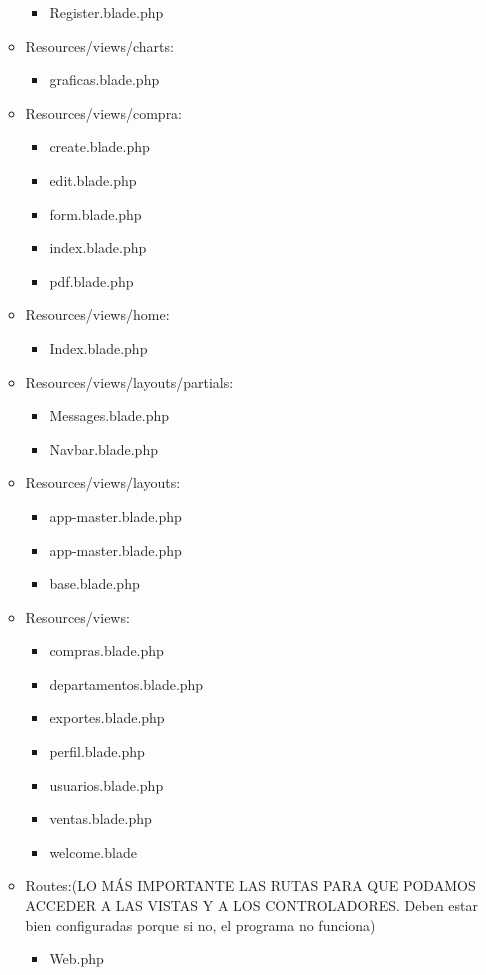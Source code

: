 \documentclass{article}
\begin{document}
\begin{enumerate}
\begin{itemize}
\begin{itemize}
            \item Register.blade.php
        \end{itemize}
    \item Resources/views/charts:
        \begin{itemize}
            \item graficas.blade.php
        \end{itemize}
    \item Resources/views/compra:
        \begin{itemize}
            \item create.blade.php
            \item edit.blade.php
            \item form.blade.php
            \item index.blade.php
            \item pdf.blade.php
        \end{itemize}
    \item Resources/views/home:
        \begin{itemize}
            \item Index.blade.php
        \end{itemize}
    \item Resources/views/layouts/partials:
        \begin{itemize}
            \item Messages.blade.php
            \item Navbar.blade.php
        \end{itemize}
    \item Resources/views/layouts:
        \begin{itemize}
            \item app-master.blade.php
            \item app-master.blade.php
            \item base.blade.php
        \end{itemize}
    \item Resources/views:
        \begin{itemize}
            \item compras.blade.php
            \item departamentos.blade.php
            \item exportes.blade.php
            \item perfil.blade.php
            \item usuarios.blade.php
            \item ventas.blade.php
            \item welcome.blade
        \end{itemize}
    \item Routes:(LO MÁS IMPORTANTE LAS RUTAS PARA QUE PODAMOS ACCEDER A LAS VISTAS Y A LOS CONTROLADORES. Deben estar bien configuradas porque si no, el programa no funciona)
        \begin{itemize}
            \item Web.php
        \end{itemize}
\end{itemize}


\end{enumerate}
\end{document}
